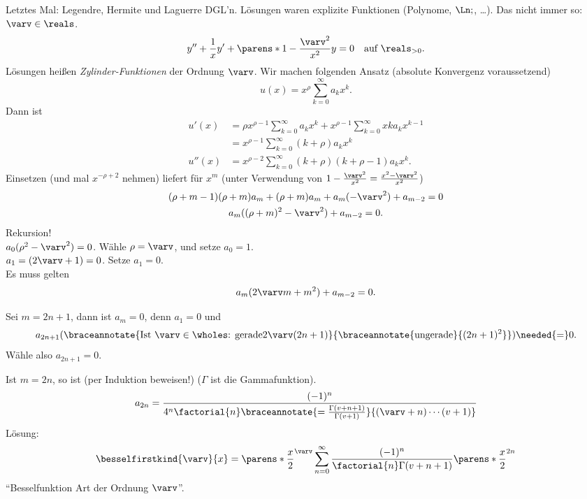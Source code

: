 Letztes Mal: Legendre, Hermite und Laguerre DGL'n. Lösungen waren explizite Funktionen (Polynome, \( \Ln; \), \dots). Das nicht immer so:
 \( \varv\in \reals \).
\begin{equation*}
  y''+\frac{1}{x}y'+\parens*{1-\frac{\varv^2}{x^2}}y=0\quad \text{auf }\reals_{>0}.
\end{equation*}
Lösungen heißen \emph{Zylinder-Funktionen} der Ordnung \( \varv \). Wir machen folgenden Ansatz (absolute Konvergenz voraussetzend)
\begin{equation*}
  u(x)=x^{\rho}\sum_{k=0}^{\infty}a_k x^k.
\end{equation*}
Dann ist
\begin{align*}
  u'(x)&=\rho x^{\rho-1}\sum_{k=0}^{\infty}a_k x^k+x^{\rho-1}\sum_{k=0}^{\infty}x k a_k x^{k-1}\\
  &=x^{\rho-1}\sum_{k=0}^{\infty}(k+\rho)a_k x^k\\
  u''(x)&=x^{\rho-2}\sum_{k=0}^{\infty}(k+\rho)(k+\rho-1)a_k x^k.
\end{align*}
Einsetzen (und mal \( x^{-\rho+2} \) nehmen) liefert für \( x^m \) (unter Verwendung von \( 1-\frac{\varv^2}{x^2}=\frac{x^2-\varv^2}{x^2} \))
\begin{gather*}
  (\rho+m-1)(\rho+m)a_m+(\rho+m)a_m+a_m(-\varv^2)+a_{m-2}=0\\
  a_m((\rho+m)^2-\varv^2)+a_{m-2}=0.
\end{gather*}
Rekursion! \\
\( a_0(\rho^2-\varv^2)=0 \). Wähle \( \rho=\varv \), und setze \( a_0=1 \). \\
\( a_1=(2\varv+1)=0 \). Setze \( a_1=0 \).\\
Es muss gelten
\begin{equation*}
  a_m(2\varv m+m^2)+a_{m-2}=0.
\end{equation*}

Sei \( m=2n+1 \), dann ist \( a_m=0 \), denn \( a_1=0 \) und
\begin{equation*}
  a_{2n+1}(\braceannotate{\text{Ist \( \varv\in\wholes \): gerade}{2\varv(2n+1)}}{\braceannotate{\text{ungerade}}{(2n+1)^2}})\needed{=}0.
\end{equation*}
Wähle also \( a_{2n+1}=0 \).

Ist \( m=2n \), so ist (per Induktion beweisen!) (\( \Gamma \) ist die Gammafunktion).
\begin{equation*}
  a_{2n}=\frac{(-1)^n}{4^n\factorial{n}\braceannotate{=\frac{\Gamma(v+n+1)}{\Gamma(v+1)}}{(\varv+n)\dotsm (v+1)}}
\end{equation*}
\timplies Lösung:
\begin{equation*}
  \besselfirstkind{\varv}{x}=\parens*{\frac{x}{2}}^{\varv}\sum_{n=0}^{\infty}\frac{(-1)^n}{\factorial{n}\Gamma(v+n+1)}\parens*{\frac{x}{2}}^{2n}
\end{equation*}
\enquote{Besselfunktion  Art der Ordnung \( \varv \)}.

